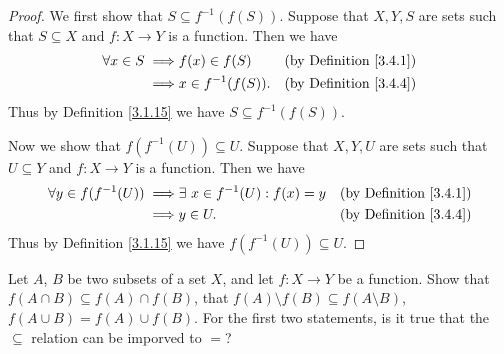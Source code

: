 \begin{proof}
    We first show that \(S \subseteq f^{-1}(f(S))\).
    Suppose that \(X, Y, S\) are sets such that \(S \subseteq X\) and \(f : X \to Y\) is a function.
    Then we have
    \begin{align*}
        \forall x \in S \implies & f(x) \in f(S)       & \text{(by Definition \ref{3.4.1})} \\
        \implies                 & x \in f^{-1}(f(S)). & \text{(by Definition \ref{3.4.4})}
    \end{align*}
    Thus by Definition \ref{3.1.15} we have \(S \subseteq f^{-1}(f(S))\).

    Now we show that \(f(f^{-1}(U)) \subseteq U\).
    Suppose that \(X, Y, U\) are sets such that \(U \subseteq Y\) and \(f : X \to Y\) is a function.
    Then we have
    \begin{align*}
        \forall y \in f(f^{-1}(U)) \implies & \exists\ x \in f^{-1}(U) : f(x) = y & \text{(by Definition \ref{3.4.1})} \\
        \implies                            & y \in U.                            & \text{(by Definition \ref{3.4.4})}
    \end{align*}
    Thus by Definition \ref{3.1.15} we have \(f(f^{-1}(U)) \subseteq U\).
\end{proof}

\begin{exercise}\label{ex 3.4.3}
    Let \(A\), \(B\) be two subsets of a set \(X\), and let \(f : X \to Y\) be a function.
    Show that \(f(A \cap B) \subseteq f(A) \cap f(B)\), that \(f(A) \setminus f(B) \subseteq f(A \setminus B)\), \(f(A \cup B) = f(A) \cup f(B)\).
    For the first two statements, is it true that the \(\subseteq\) relation can be imporved to \(=\)?
\end{exercise}


